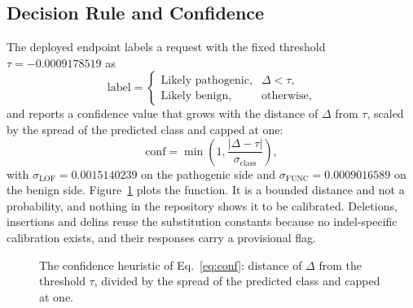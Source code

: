 \documentclass[10pt,journal,a4paper]{IEEEtran}
\def\confTau{-0.0009178519}
\def\confSigLOF{0.0015140239}
\def\confSigFUNC{0.0009016589}
\begin{document}
\subsection{Decision Rule and Confidence}
The deployed endpoint labels a request with the fixed threshold $\tau=-0.0009178519$ as
\begin{equation}
\mathrm{label}=\begin{cases}
\text{Likely pathogenic}, & \Delta < \tau,\\
\text{Likely benign}, & \text{otherwise},
\end{cases}
\label{eq:call}
\end{equation}
and reports a confidence value that grows with the distance of $\Delta$ from $\tau$, scaled by the spread of the predicted class and capped at one:
\begin{equation}
\mathrm{conf}=\min\!\left(1,\frac{|\Delta-\tau|}{\sigma_{\mathrm{class}}}\right),
\label{eq:conf}
\end{equation}
with $\sigma_{\mathrm{LOF}}=0.0015140239$ on the pathogenic side and $\sigma_{\mathrm{FUNC}}=0.0009016589$ on the benign side. Figure~\ref{fig:conf} plots the function. It is a bounded distance and not a probability, and nothing in the repository shows it to be calibrated. Deletions, insertions and delins reuse the substitution constants because no indel-specific calibration exists, and their responses carry a provisional flag.

\begin{figure}[!t]
\centering
{}
\caption{The confidence heuristic of Eq.~\eqref{eq:conf}: distance of $\Delta$ from the threshold $\tau$, divided by the spread of the predicted class and capped at one.}
\label{fig:conf}
\end{figure}
\end{document}
